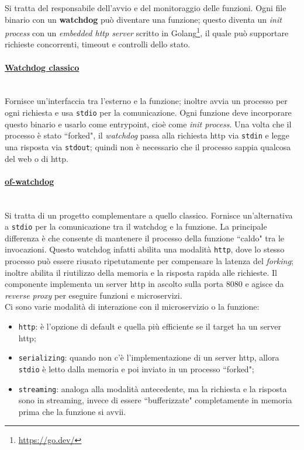 \documentclass[12pt,a4paper,openany,twoside]{book}
\begin{document}
Si tratta del responsabile dell'avvio e del monitoraggio delle funzioni. Ogni file binario con un \textbf{watchdog} può diventare una funzione; questo diventa un \textit{init process} con un \textit{embedded \ac{http} server} scritto in Golang\footnote{\url{https://go.dev/}}, il quale può supportare richieste concorrenti, timeout e controlli dello stato.

\paragraph{\underline{Watchdog classico}} ~\\
Fornisce un'interfaccia tra l'esterno e la funzione; inoltre avvia un processo per ogni richiesta e usa \texttt{stdio} per la comunicazione. Ogni funzione deve incorporare questo binario e usarlo come entrypoint, cioè come \textit{init process}. Una volta che il processo è stato ``forked", il \textit{watchdog} passa alla richiesta \ac{http} via \texttt{stdin} e legge una risposta via \texttt{stdout}; quindi non è necessario che il processo sappia qualcosa del web o di \ac{http}.

\paragraph{\underline{of-watchdog}} ~\\
Si tratta di un progetto complementare a quello classico. Fornisce un'alternativa a \texttt{stdio} per la comunicazione tra il watchdog e la funzione. La principale differenza è che consente di mantenere il processo della funzione ``caldo" tra le invocazioni. Questo watchdog infatti abilita una modalità \texttt{http}, dove lo stesso processo può essere riusato ripetutamente per compensare la latenza del \textit{forking}; inoltre abilita il riutilizzo della memoria e la risposta rapida alle richieste. Il componente implementa un server \ac{http} in ascolto sulla porta 8080 e agisce da \textit{reverse proxy} per eseguire funzioni e microservizi.
\\
Ci sono varie modalità di interazione con il microservizio o la funzione:
\begin{itemize}
    \item \texttt{\ac{http}}: è l'opzione di default e quella più efficiente se il target ha un server \ac{http};
    
    \item \texttt{serializing}: quando non c'è l'implementazione di un server \ac{http}, allora \texttt{stdio} è letto dalla memoria e poi inviato in un processo ``forked";
    
    \item \texttt{streaming}: analoga alla modalità antecedente, ma la richiesta e la risposta sono in streaming, invece di essere ``bufferizzate" completamente in memoria prima che la funzione si avvii. 
\end{itemize}
\end{document}
